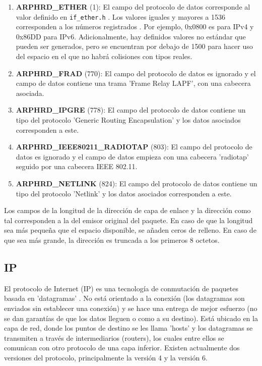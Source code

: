 \begin{enumerate}
    \item \textbf{ARPHRD\_ETHER} (1): El campo del protocolo de datos corresponde al valor definido en \texttt{if\_ether.h} \cite{linuxifether}. Los valores iguales y mayores a 1536 corresponden a los números registrados \cite{etherprotocolnumbers}. Por ejemplo, 0x0800 es para IPv4 y 0x86DD para IPv6. Adicionalmente, hay definidos valores no estándar que pueden ser generados, pero se encuentran por debajo de 1500 para hacer uso del espacio en el que no habrá colisiones con tipos reales.
    \item \textbf{ARPHRD\_FRAD} (770): El campo del protocolo de datos es ignorado y el campo de datos contiene una trama 'Frame Relay LAPF', con una cabecera asociada. 
    \item \textbf{ARPHRD\_IPGRE} (778): El campo del protocolo de datos contiene un tipo del protocolo 'Generic Routing Encapsulation' y los datos asociados corresponden a este.
    \item \textbf{ARPHRD\_IEEE80211\_RADIOTAP} (803): El campo del protocolo de datos es ignorado y el campo de datos empieza con una cabecera 'radiotap' seguido por una cabecera IEEE 802.11.
    \item \textbf{ARPHRD\_NETLINK} (824): El campo del protocolo de datos contiene un tipo del protocolo 'Netlink' y los datos asociados corresponden a este.
\end{enumerate}

Los campos de la longitud de la dirección de capa de enlace y la dirección como tal corresponden a la del emisor original del paquete. En caso de que la longitud sea más pequeña que el espacio disponible, se añaden ceros de relleno. En caso de que sea más grande, la dirección es truncada a los primeros 8 octetos.

\subsection{IP} \label{ipformat}

El protocolo de Internet (IP) es una tecnología de conmutación de paquetes basada en 'datagramas' \cite{iptechslides}. No está orientado a la conexión (los datagramas son enviados sin establecer una conexión) y se hace una entrega de mejor esfuerzo (no se dan garantías de que los datos lleguen o como a su destino). Está ubicado en la capa de red, donde los puntos de destino se les llama 'hosts' y los datagramas se transmiten a través de intermediarios (routers), los cuales entre ellos se comunican con otro protocolo de una capa inferior. Existen actualmente dos versiones del protocolo, principalmente la versión 4 y la versión 6.

